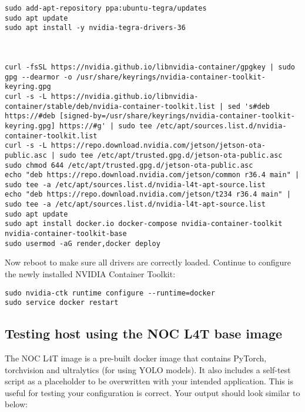 \documentclass[11pt]{article}
\begin{document}


\lstset{style=console}
\begin{lstlisting}
sudo add-apt-repository ppa:ubuntu-tegra/updates
sudo apt update
sudo apt install -y nvidia-tegra-drivers-36



curl -fsSL https://nvidia.github.io/libnvidia-container/gpgkey | sudo gpg --dearmor -o /usr/share/keyrings/nvidia-container-toolkit-keyring.gpg
curl -s -L https://nvidia.github.io/libnvidia-container/stable/deb/nvidia-container-toolkit.list | sed 's#deb https://#deb [signed-by=/usr/share/keyrings/nvidia-container-toolkit-keyring.gpg] https://#g' | sudo tee /etc/apt/sources.list.d/nvidia-container-toolkit.list
curl -s -L https://repo.download.nvidia.com/jetson/jetson-ota-public.asc | sudo tee /etc/apt/trusted.gpg.d/jetson-ota-public.asc
sudo chmod 644 /etc/apt/trusted.gpg.d/jetson-ota-public.asc
echo "deb https://repo.download.nvidia.com/jetson/common r36.4 main" | sudo tee -a /etc/apt/sources.list.d/nvidia-l4t-apt-source.list
echo "deb https://repo.download.nvidia.com/jetson/t234 r36.4 main" | sudo tee -a /etc/apt/sources.list.d/nvidia-l4t-apt-source.list
sudo apt update
sudo apt install docker.io docker-compose nvidia-container-toolkit nvidia-container-toolkit-base
sudo usermod -aG render,docker deploy
\end{lstlisting}

Now reboot to make sure all drivers are correctly loaded. Continue to configure the newly installed NVIDIA Container Toolkit:

\lstset{style=console}
\begin{lstlisting}
sudo nvidia-ctk runtime configure --runtime=docker
sudo service docker restart
\end{lstlisting}


\subsection{Testing host using the NOC L4T base image}

The NOC L4T image is a pre-built docker image that contains PyTorch, torchvision and ultralytics (for using YOLO models). It also includes a self-test script as a placeholder to be overwritten with your intended application. This is useful for testing your configuration is correct. Your output should look similar to below:
\end{document}
